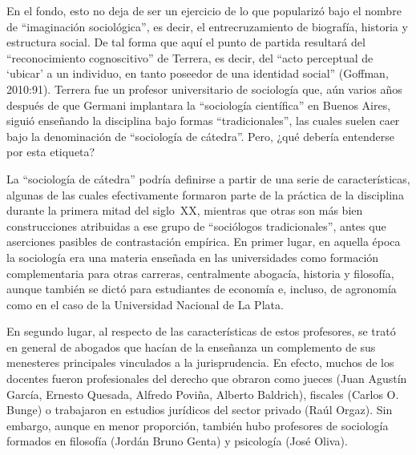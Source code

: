 En el fondo, esto no deja de ser un ejercicio de lo que \textcite{1451-WRIGHTMILLS1956} popularizó bajo el nombre de \enquote{imaginación sociológica}, es decir, el entrecruzamiento de biografía, historia y estructura social. De tal forma que aquí el punto de partida resultará del \enquote{reconocimiento cognoscitivo} de Terrera, es decir, del \enquote{acto perceptual de \enquote{ubicar} a un individuo, en tanto poseedor de una identidad social} (Goffman, 2010:91). Terrera fue un profesor universitario de sociología que, aún varios años después de que Germani implantara la \enquote{sociología científica} en Buenos Aires, siguió enseñando la disciplina bajo formas \enquote{tradicionales}, las cuales suelen caer bajo la denominación de \enquote{sociología de cátedra}. Pero, ¿qué debería entenderse por esta etiqueta?

La ``sociología de cátedra'' podría definirse a partir de una serie de características, algunas de las cuales efectivamente formaron parte de la práctica de la disciplina durante la primera mitad del siglo~XX, mientras que otras son más bien construcciones atribuidas a ese grupo de ``sociólogos tradicionales'', antes que aserciones pasibles de contrastación empírica. En primer lugar, en aquella época la sociología era una materia enseñada en las universidades como formación complementaria para otras carreras, centralmente abogacía, historia y filosofía, aunque también se dictó para estudiantes de economía e, incluso, de agronomía como en el caso de la Universidad Nacional de La Plata.

En segundo lugar, al respecto de las características de estos profesores, se trató en general de abogados que hacían de la enseñanza un complemento de sus menesteres principales vinculados a la jurisprudencia. En efecto, muchos de los docentes fueron profesionales del derecho que obraron como jueces (Juan Agustín García, Ernesto Quesada, Alfredo Poviña, Alberto Baldrich), fiscales (Carlos O. Bunge) o trabajaron en estudios jurídicos del sector privado (Raúl Orgaz). Sin embargo, aunque en menor proporción, también hubo profesores de sociología formados en filosofía (Jordán Bruno Genta) y psicología (José Oliva).

